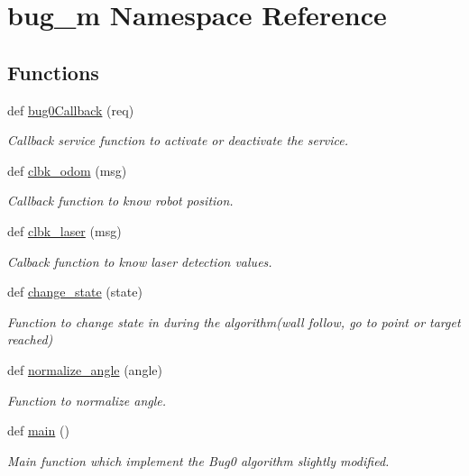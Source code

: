 \hypertarget{namespacebug__m}{}\section{bug\+\_\+m Namespace Reference}
\label{namespacebug__m}
\subsection*{Functions}
\begin{DoxyCompactItemize}
\item 
def \hyperlink{namespacebug__m_add2465382834c48e8e5ec6e361fb6eec}{bug0\+Callback} (req)
\begin{DoxyCompactList}\small\item\em Callback service function to activate or deactivate the service. \end{DoxyCompactList}\item 
def \hyperlink{namespacebug__m_a27cfd2a326148157d3e5e0affbe763f3}{clbk\+\_\+odom} (msg)
\begin{DoxyCompactList}\small\item\em Callback function to know robot position. \end{DoxyCompactList}\item 
def \hyperlink{namespacebug__m_a6ab3d92b5b6ea12eaa52bf21cfa111f1}{clbk\+\_\+laser} (msg)
\begin{DoxyCompactList}\small\item\em Calback function to know laser detection values. \end{DoxyCompactList}\item 
def \hyperlink{namespacebug__m_aca19305feae5c5489e7452e921fcbd9c}{change\+\_\+state} (state)
\begin{DoxyCompactList}\small\item\em Function to change state in during the algorithm(wall follow, go to point or target reached) \end{DoxyCompactList}\item 
def \hyperlink{namespacebug__m_a6547c5ebcd1d3aa3e104a5b573e47862}{normalize\+\_\+angle} (angle)
\begin{DoxyCompactList}\small\item\em Function to normalize angle. \end{DoxyCompactList}\item 
def \hyperlink{namespacebug__m_a357589ad533151302b9fa9a893833382}{main} ()
\begin{DoxyCompactList}\small\item\em Main function which implement the Bug0 algorithm slightly modified. \end{DoxyCompactList}\end{DoxyCompactItemize}
